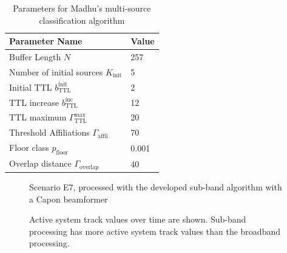 \begin{appendix}
\begin{table}[!ht]
\centering

\begin{tabular}{l|l}
\toprule
Parameter Name            & Value \\\midrule
Buffer Length   $N$          & 257   \\
Number of initial sources $K_\text{init}$ & 5     \\
Initial TTL $b_\text{TTL}^\text{init}$              & 2     \\
TTL increase $b_\text{TTL}^\text{inc}$             & 12    \\
TTL maximum  $\Gamma_\text{TTL}^\text{max}$              & 20\\
Threshold Affiliations $\Gamma_\text{affil}$   & 70    \\
Floor class   $p_\text{floor}$            & 0.001 \\
Overlap distance  $\Gamma_\text{overlap}$        & 40    \\
\bottomrule
\end{tabular}
\caption{Parameters for Madhu's multi-source classification algorithm}
\label{tab:para_madhu}
\end{table}


\begin{figure}[!ht]
		\centering
		\def\svgwidth{1\linewidth}
		\small
		\caption{Scenario E7, processed with the developed sub-band algorithm with a Capon beamformer}
		\label{fig:results_idc_ex1_comp}
\end{figure}

\begin{figure}[!ht]
	\hfill
	\caption{Active system track values over time are shown. Sub-band processing has more active system track values than the broadband processing.}
	\label{fig:results_comp_bb_vs_sb}
\end{figure}


\end{appendix}
